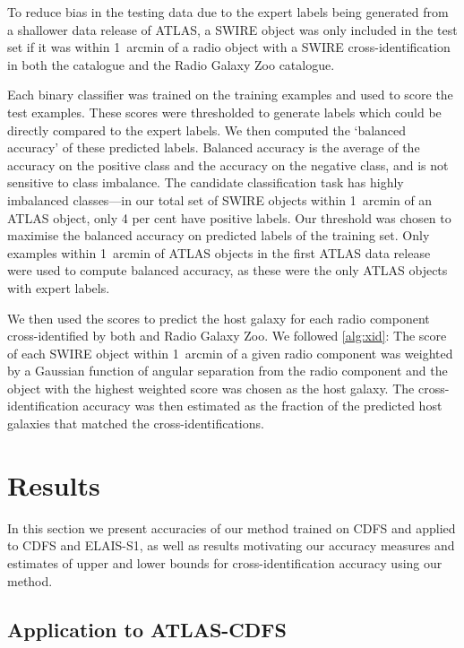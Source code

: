     To reduce bias in the testing data due to the expert labels being
    generated from a shallower data release of ATLAS, a SWIRE object was only
    included in the test set if it was within 1~arcmin of a radio object with
    a SWIRE cross-identification in both the \citet{norris06} catalogue and the
    Radio Galaxy Zoo catalogue.

    Each binary classifier was trained on the training examples and used to
    {score the test examples. These scores were thresholded to generate labels which could be directly compared
    to the expert labels. We then computed the `balanced accuracy' of these predicted labels.} Balanced
    accuracy is the average of the accuracy on the positive class and the
    accuracy on the negative class, and is not sensitive to class imbalance.
    The candidate classification task has highly imbalanced classes---in our
    total set of SWIRE objects within 1~arcmin of an ATLAS object, only 4 per
    cent have positive labels. {Our threshold was chosen to maximise the balanced
    accuracy on predicted labels of the training set.} Only examples within 1~arcmin of ATLAS objects
    in the first ATLAS data release \citep{norris06} were used to compute
    balanced accuracy, as these were the only ATLAS objects with expert labels.

    We then used the scores to predict the host galaxy
    for each radio component cross-identified by both \citet{norris06} and
    Radio Galaxy Zoo. {We followed \autoref{alg:xid}:
    The score of each SWIRE object within 1~arcmin of a given radio
    component was weighted by a Gaussian function of angular separation from the
    radio component and the object with the highest
    weighted score was chosen as the host galaxy.} The
    {cross-identification accuracy} was then estimated as the
    fraction of the predicted host galaxies that matched the \citet{norris06}
    cross-identifications.

\section{Results}\label{sec:atlas-xid-results}

  In this section we present accuracies of our method trained on CDFS and
  applied to CDFS and ELAIS-S1, as well as results motivating our accuracy
  measures and estimates of upper and lower bounds for cross-identification
  accuracy using our method.

  \subsection{Application to ATLAS-CDFS}
  \label{sec:atlas-xid-cdfs-results}

